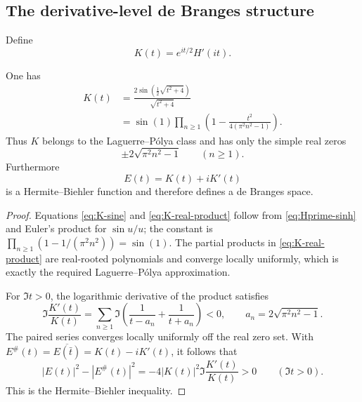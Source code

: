 \subsection{The derivative-level de Branges structure}

Define
\begin{equation}\label{eq:K-rotated-derivative}
 K(t)=e^{it/2}H'(it).
\end{equation}

\begin{proposition}
\label{prop:H-rotated-LP}
One has
\begin{align}
 K(t)
 &=\frac{2\sin\!\left(\frac12\sqrt{t^2+4}\right)}{\sqrt{t^2+4}}
 \label{eq:K-sine}\\
 &=\sin(1)\prod_{n\geq1}
   \left(1-\frac{t^2}{4(\pi^2n^2-1)}\right).
 \label{eq:K-real-product}
\end{align}
Thus $K$ belongs to the Laguerre--P\'olya class and has only the simple real
zeros
\[
 \pm2\sqrt{\pi^2n^2-1}\qquad(n\geq1).
\]
Furthermore
\begin{equation}\label{eq:HB-function}
 E(t)=K(t)+iK'(t)
\end{equation}
is a Hermite--Biehler function and therefore defines a de Branges space.
\end{proposition}

\begin{proof}
Equations \eqref{eq:K-sine} and \eqref{eq:K-real-product} follow from
\eqref{eq:Hprime-sinh} and Euler's product for $\sin u/u$; the constant is
$\prod_{n\geq1}(1-1/(\pi^2n^2))=\sin(1)$.  The partial products in
\eqref{eq:K-real-product} are real-rooted polynomials and converge locally
uniformly, which is exactly the required Laguerre--P\'olya approximation.

For $\Im t>0$, the logarithmic derivative of the product satisfies
\[
 \Im\frac{K'(t)}{K(t)}
 =\sum_{n\geq1}\Im\left(
   \frac1{t-a_n}+\frac1{t+a_n}\right)<0,
 \qquad a_n=2\sqrt{\pi^2n^2-1}.
\]
The paired series converges locally uniformly off the real zero set.  With
$E^\#(t)=\overline{E(\bar t)}=K(t)-iK'(t)$, it follows that
\[
 |E(t)|^2-|E^\#(t)|^2
 =-4|K(t)|^2\Im\frac{K'(t)}{K(t)}>0
 \qquad(\Im t>0).
\]
This is the Hermite--Biehler inequality.
\end{proof}

